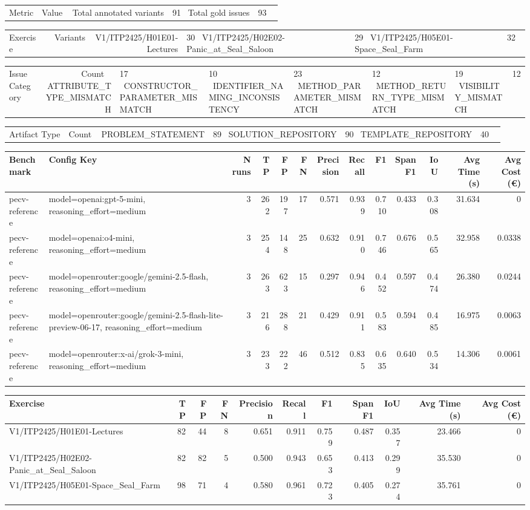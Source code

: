 \begin{tabular}{lr}
Metric & Value \
\hline
Total annotated variants & 91 \
Total gold issues & 93 \
\end{tabular}

\begin{tabular}{lr}
Exercise & Variants \
\hline
V1/ITP2425/H01E01-Lectures & 30 \
V1/ITP2425/H02E02-Panic\_at\_Seal\_Saloon & 29 \
V1/ITP2425/H05E01-Space\_Seal\_Farm & 32 \
\end{tabular}

\begin{tabular}{lr}
Issue Category & Count \
\hline
ATTRIBUTE\_TYPE\_MISMATCH & 17 \
CONSTRUCTOR\_PARAMETER\_MISMATCH & 10 \
IDENTIFIER\_NAMING\_INCONSISTENCY & 23 \
METHOD\_PARAMETER\_MISMATCH & 12 \
METHOD\_RETURN\_TYPE\_MISMATCH & 19 \
VISIBILITY\_MISMATCH & 12 \
\end{tabular}

\begin{tabular}{lr}
Artifact Type & Count \
\hline
PROBLEM\_STATEMENT & 89 \
SOLUTION\_REPOSITORY & 90 \
TEMPLATE\_REPOSITORY & 40 \
\end{tabular}

\begin{tabular}{llrrrrrrrrrrr}
Benchmark & Config Key & N runs & TP & FP & FN & Precision & Recall & F1 & Span F1 & IoU & Avg Time (s) & Avg Cost (€) \\
\hline
pecv-reference & model=openai:gpt-5-mini, reasoning\_effort=medium & 3 & 262 & 197 & 17 & 0.571 & 0.939 & 0.710 & 0.433 & 0.308 & 31.634 & 0 \\
pecv-reference & model=openai:o4-mini, reasoning\_effort=medium & 3 & 254 & 148 & 25 & 0.632 & 0.910 & 0.746 & 0.676 & 0.565 & 32.958 & 0.0338 \\
pecv-reference & model=openrouter:google/gemini-2.5-flash, reasoning\_effort=medium & 3 & 263 & 623 & 15 & 0.297 & 0.946 & 0.452 & 0.597 & 0.474 & 26.380 & 0.0244 \\
pecv-reference & model=openrouter:google/gemini-2.5-flash-lite-preview-06-17, reasoning\_effort=medium & 3 & 216 & 288 & 21 & 0.429 & 0.911 & 0.583 & 0.594 & 0.485 & 16.975 & 0.0063 \\
pecv-reference & model=openrouter:x-ai/grok-3-mini, reasoning\_effort=medium & 3 & 233 & 222 & 46 & 0.512 & 0.835 & 0.635 & 0.640 & 0.534 & 14.306 & 0.0061 \\
\end{tabular}

\begin{tabular}{lrrrrrrrrrr}
Exercise & TP & FP & FN & Precision & Recall & F1 & Span F1 & IoU & Avg Time (s) & Avg Cost (€) \\
\hline
V1/ITP2425/H01E01-Lectures & 82 & 44 & 8 & 0.651 & 0.911 & 0.759 & 0.487 & 0.357 & 23.466 & 0 \\
V1/ITP2425/H02E02-Panic\_at\_Seal\_Saloon & 82 & 82 & 5 & 0.500 & 0.943 & 0.653 & 0.413 & 0.299 & 35.530 & 0 \\
V1/ITP2425/H05E01-Space\_Seal\_Farm & 98 & 71 & 4 & 0.580 & 0.961 & 0.723 & 0.405 & 0.274 & 35.761 & 0 \\
\end{tabular}

